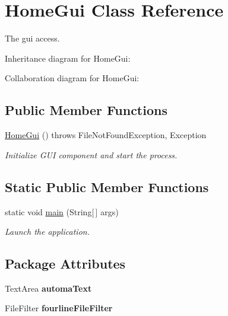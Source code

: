 \hypertarget{class_home_gui}{\section{Home\-Gui Class Reference}
\label{class_home_gui}
}


The gui access.  




Inheritance diagram for Home\-Gui\-:


Collaboration diagram for Home\-Gui\-:
\subsection*{Public Member Functions}
\begin{DoxyCompactItemize}
\item 
\hyperlink{class_home_gui_add92e1cf71983b9cc6f70f040d3ea593}{Home\-Gui} ()  throws File\-Not\-Found\-Exception, Exception 
\begin{DoxyCompactList}\small\item\em Initialize G\-U\-I component and start the process. \end{DoxyCompactList}\end{DoxyCompactItemize}
\subsection*{Static Public Member Functions}
\begin{DoxyCompactItemize}
\item 
\hypertarget{class_home_gui_a241867731938068ae82ae7d5e7371fa3}{static void \hyperlink{class_home_gui_a241867731938068ae82ae7d5e7371fa3}{main} (String\mbox{[}$\,$\mbox{]} args)}\label{class_home_gui_a241867731938068ae82ae7d5e7371fa3}

\begin{DoxyCompactList}\small\item\em Launch the application. \end{DoxyCompactList}\end{DoxyCompactItemize}
\subsection*{Package Attributes}
\begin{DoxyCompactItemize}
\item 
\hypertarget{class_home_gui_a6b00edbcb893105ddc5e3b2beb4c2dca}{Text\-Area {\bfseries automa\-Text}}\label{class_home_gui_a6b00edbcb893105ddc5e3b2beb4c2dca}

\item 
\hypertarget{class_home_gui_a7f56e390a2982689b92cee117f50e987}{File\-Filter {\bfseries fourline\-File\-Filter}}\label{class_home_gui_a7f56e390a2982689b92cee117f50e987}

\end{DoxyCompactItemize}
